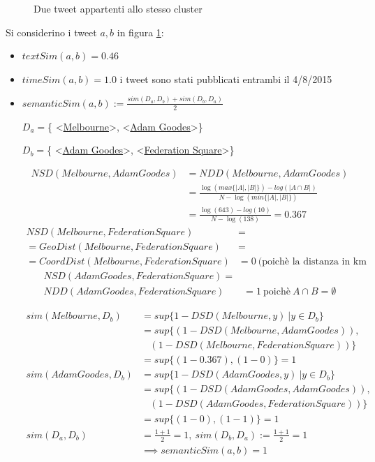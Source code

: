 \documentclass[a4paper,12pt]{report}
\begin{document}
\begin{figure}
    \caption{Due tweet appartenti allo stesso cluster}
    \label{fig:twotweets}
\end{figure} 
Si considerino i tweet $a,b$ in figura \ref{fig:twotweets}:

\begin{itemize}
\item $textSim(a,b)=0.46$ 
\item $timeSim(a,b)=1.0$ i tweet sono stati pubblicati entrambi il 4/8/2015
\item $semanticSim(a,b):=\frac{sim(D_a,D_b)+sim(D_b,D_a)}{2} $



  $D_a=$\{ \textless\href{http://dbpedia.org/resource/Melbourne}{Melbourne}\textgreater, \textless\href{http://dbpedia.org/resource/Adam_Goodes}{Adam Goodes}\textgreater\}
  
  $D_b=$\{ \textless\href{http://dbpedia.org/resource/Adam_Goodes}{Adam Goodes}\textgreater, \textless\href{http://dbpedia.org/resource/Federation_Square}{Federation Square}\textgreater\}
  
\begin{align*}
 NSD(Melbourne,Adam Goodes)&=NDD(Melbourne,Adam Goodes)\\
 &= \frac{\log(max\{|A|,|B|\})-log(|A \cap B|)}{N-\log(min\{|A|,|B|\})}\\
 &= \frac{\log(643)-log(10)}{N-\log(138)}=0.367  
\end{align*} 
\begin{align*}
 NSD(Melbourne,Federation Square)&=\\
 =GeoDist(Melbourne,Federation Square)&=\\
 =CoordDist(Melbourne,Federation Square) &=0 \: \text{(poichè la distanza in km è 0.8)}
\end{align*}  
\begin{align*}
 NSD(Adam Goodes,Federation Square)=&\\
 NDD(Adam Goodes,Federation Square)&=1 \: \text{poichè} \: A \cap B=\emptyset
\end{align*} 

\begin{align*}
 sim(Melbourne,D_b)&=sup\{1-DSD(Melbourne,y)\:| y\in D_b \}\\
	&=sup\{(1-DSD(Melbourne,Adam Goodes)),\\
	&\:\:\:\:(1-DSD(Melbourne,Federation Square))\}\\
	&=sup\{(1-0.367),(1-0)\}=1	\\	  
 sim(Adam Goodes,D_b)&=sup\{1-DSD(Adam Goodes,y)\:| y\in D_b \}\\
	&=sup\{(1-DSD(Adam Goodes,Adam Goodes)),\\
	&\:\:\:\:(1-DSD(Adam Goodes,Federation Square))\}\\
	&=sup\{(1-0),(1-1)\}=1\\		 
sim(D_a,D_b) &=\frac{1+1}{2}=1 ,\: sim(D_b,D_a) :=\frac{1+1}{2}=1\\
&\implies semanticSim(a,b)=1
\end{align*}
\end{itemize} 
\end{document}
